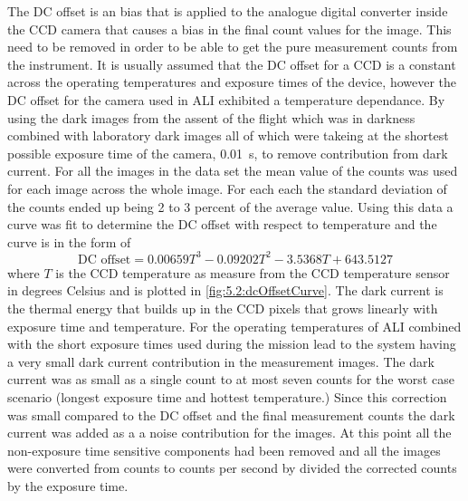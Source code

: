 The DC offset is an bias that is applied to the analogue digital converter inside the CCD camera that causes a bias in the final count values for the image. This need to be removed in order to be able to get the pure measurement counts from the instrument. It is usually assumed that the DC offset for a CCD is a constant across the operating temperatures and exposure times of the device, however the DC offset for the camera used in ALI exhibited a temperature dependance. By using the dark images from the assent of the flight which was in darkness combined with laboratory dark images all of which were takeing at the shortest possible exposure time of the camera, 0.01~s, to remove contribution from dark current. For all the images in the data set the mean value of the counts was used for each image across the whole image. For each each the standard deviation of the counts ended up being 2 to 3 percent of the average value. Using this data a curve was fit to determine the DC offset with respect to temperature and the curve is in the form of
\begin{equation}
    \text{DC offset} = 0.00659T^{3}-0.09202T^{2}-3.5368T+643.5127
    \label{eqn:5.2:DcOffsetCurve}
\end{equation}
where $T$ is the CCD temperature as measure from the CCD temperature sensor in degrees Celsius and is plotted in \autoref{fig:5.2:dcOffsetCurve}. The dark current is the thermal energy that builds up in the CCD pixels that grows linearly with exposure time and temperature. For the operating temperatures of ALI combined with the short exposure times used during the mission lead to the system having a very small dark current contribution in the measurement images. The dark current was as small as a single count to at most seven counts for the worst case scenario (longest exposure time and hottest temperature.) Since this correction was small compared to the DC offset and the final measurement counts the dark current was added as a a noise contribution for the images. At this point all the non-exposure time sensitive components had been removed and all the images were converted from counts to counts per second by divided the corrected counts by the exposure time.

